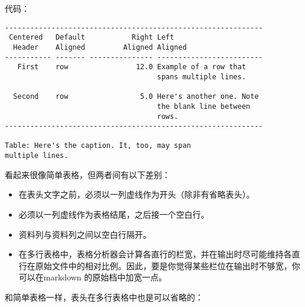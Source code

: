 \documentclass[fancyhdr,bookmark]{ctexbook}
\begin{document}
代码：

\begin{lstlisting}
-------------------------------------------------------------
 Centered   Default           Right Left
  Header    Aligned         Aligned Aligned
----------- ------- --------------- -------------------------
   First    row                12.0 Example of a row that
                                    spans multiple lines.

  Second    row                 5.0 Here's another one. Note
                                    the blank line between
                                    rows.
-------------------------------------------------------------

Table: Here's the caption. It, too, may span
multiple lines.
\end{lstlisting}

看起来很像简单表格，但两者间有以下差别：

\begin{itemize}
\itemsep1pt\parskip0pt
\item
  在表头文字之前，必须以一列虚线作为开头（除非有省略表头）。
\item
  必须以一列虚线作为表格结尾，之后接一个空白行。
\item
  资料列与资料列之间以空白行隔开。
\item
  在多行表格中，表格分析器会计算各直行的栏宽，并在输出时尽可能维持各直行在原始文件中的相对比例。因此，要是你觉得某些栏位在输出时不够宽，你可以在markdown
  的原始档中加宽一点。
\end{itemize}

和简单表格一样，表头在多行表格中也是可以省略的：
\end{document}
